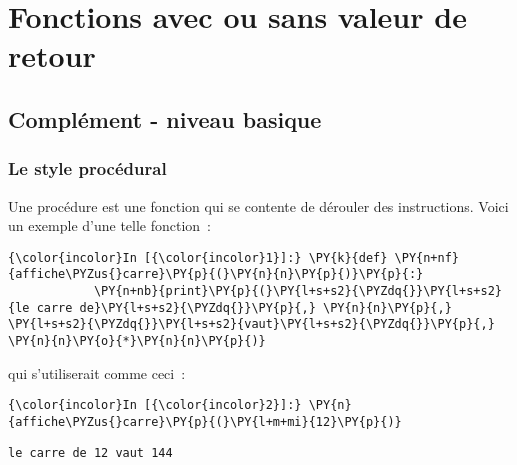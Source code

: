     
    
    
    

    

    \hypertarget{fonctions-avec-ou-sans-valeur-de-retour}{%
\section{Fonctions avec ou sans valeur de
retour}\label{fonctions-avec-ou-sans-valeur-de-retour}}

    \hypertarget{compluxe9ment---niveau-basique}{%
\subsection{Complément - niveau
basique}\label{compluxe9ment---niveau-basique}}

    \hypertarget{le-style-procuxe9dural}{%
\subsubsection{Le style procédural}\label{le-style-procuxe9dural}}

    Une procédure est une fonction qui se contente de dérouler des
instructions. Voici un exemple d'une telle fonction~:

    \begin{Verbatim}[commandchars=\\\{\},frame=single,framerule=0.3mm,rulecolor=\color{cellframecolor}]
{\color{incolor}In [{\color{incolor}1}]:} \PY{k}{def} \PY{n+nf}{affiche\PYZus{}carre}\PY{p}{(}\PY{n}{n}\PY{p}{)}\PY{p}{:}
            \PY{n+nb}{print}\PY{p}{(}\PY{l+s+s2}{\PYZdq{}}\PY{l+s+s2}{le carre de}\PY{l+s+s2}{\PYZdq{}}\PY{p}{,} \PY{n}{n}\PY{p}{,} \PY{l+s+s2}{\PYZdq{}}\PY{l+s+s2}{vaut}\PY{l+s+s2}{\PYZdq{}}\PY{p}{,} \PY{n}{n}\PY{o}{*}\PY{n}{n}\PY{p}{)}
\end{Verbatim}


    qui s'utiliserait comme ceci~:

    \begin{Verbatim}[commandchars=\\\{\},frame=single,framerule=0.3mm,rulecolor=\color{cellframecolor}]
{\color{incolor}In [{\color{incolor}2}]:} \PY{n}{affiche\PYZus{}carre}\PY{p}{(}\PY{l+m+mi}{12}\PY{p}{)}
\end{Verbatim}


    \begin{Verbatim}[commandchars=\\\{\},frame=single,framerule=0.3mm,rulecolor=\color{cellframecolor}]
le carre de 12 vaut 144
\end{Verbatim}

